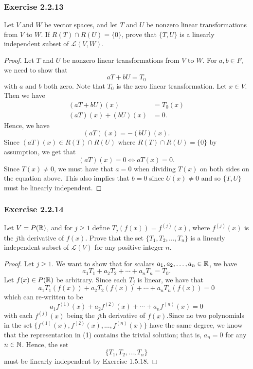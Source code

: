 \subsubsection{Exercise 2.2.13} Let \( V  \) and \( W  \) be vector spaces, and let \( T  \) and \( U  \) be nonzero linear transformations from \( V  \) to \( W  \). If \( R(T) \cap R(U) = \{ 0  \}   \), prove that \( \{ T, U  \}   \) is a linearly independent subset of \( \mathcal{L}(V, W ) \).
\begin{proof}
Let \( T \) and \( U  \) be nonzero linear transformations from \( V  \) to \( W  \). For \( a,b \in F  \), we need to show that 
\[  aT + bU = {T}_{0} \] with \( a  \) and \( b  \) both zero. Note that \( {T}_{0} \) is the zero linear transformation. Let \( x \in V  \). Then we have
\begin{align*}
    (aT + bU)(x) &= {T}_{0}(x)  \\
    (aT)(x) + (bU)(x) &= 0. 
\end{align*}
Hence, we have
\[  (aT)(x) = -(bU)(x).  \]
Since \( (aT)(x) \in R(T) \cap R(U) \) where \( R(T) \cap R(U) = \{ 0  \}   \) by assumption, we get that
\[  (aT)(x) = 0 \iff aT(x) = 0. \]
Since \( T(x) \neq 0  \), we must have that \( a = 0  \) when dividing \( T(x)  \) on both sides on the equation above. This also implies that \( b = 0  \) since \( U(x) \neq 0  \) and so \( \{ T, U  \}  \) must be linearly independent.
\end{proof}

\subsubsection{Exercise 2.2.14} Let \( V = P(\mathbb{R}) \), and for \( j \geq 1   \) define \( {T}_{j}(f(x)) = f^{(j)}(x)  \), where \( f^{(j)}(x) \) is the \( j \)th derivative of \( f(x) \). Prove that the set \( \{ {T}_{1}, {T}_{2}, \dots, {T}_{n} \}  \) is a linearly independent subset of \( \mathcal{L}(V) \) for any positive integer \( n \).
\begin{proof}
Let \( j \geq 1  \). We want to show that for scalars \( {a}_{1}, {a}_{2}, \dots, {a}_{n} \in \mathbb{R}  \), we have
\[  {a}_{1} {T}_{1} + {a}_{2} {T}_{2} + \cdots + {a}_{n} {T}_{n} = {T}_{0}. \]
Let \( f(x) \in P(\mathbb{R}) \) be arbitrary. Since each \( {T}_{j} \) is linear, we have that
\[  {a}_{1} {T}_{1}(f(x)) + {a}_{2} {T}_{2}(f(x)) + \cdots + {a}_{n} {T}_{n}(f(x)) = 0 \]
which can re-written to be
\[  {a}_{1} f^{(1)}(x) + {a}_{2} f^{(2)}(x) + \cdots + {a}_{n} f^{(n)}(x) = 0 \tag{1} \]
with each \( f^{(j)}(x) \) being the \( j \)th derivative of \( f(x) \).Since no two polynomials in the set \( \{ f^{(1)}(x), f^{(2)}(x), \dots, f^{(n)}(x) \}  \) have the same degree, we know that the representation in (1) contains the trivial solution; that is, \( {a}_{n} = 0  \) for any \( n \in \mathbb{N}   \). Hence, the set \[  \{ {T}_{1}, {T}_{2}, \dots, {T}_{n} \}  \] must be linearly independent by Exercise 1.5.18.
\end{proof}

